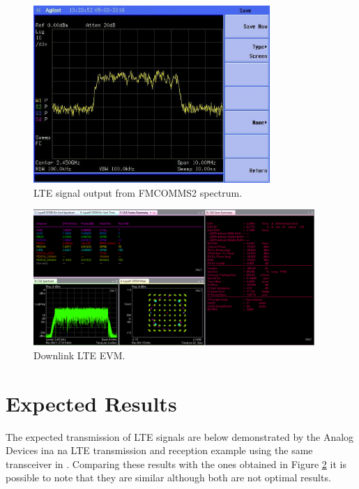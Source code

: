 \begin{figure}[htbp]
    \centering
    \includegraphics[width=0.8\textwidth,
    trim={0 0 {.27\textwidth} {.1\textwidth}},
    clip]{./figures/lte_5m}
    \caption{ LTE signal output from FMCOMMS2 spectrum.
    \label{fig:lte5m}}
\end{figure}

%
\begin{figure}[htbp]
    \centering
    \includegraphics[width=0.95\textwidth]{./figures/evm}
    \caption{ Downlink LTE EVM.
    \label{fig:evm}}
\end{figure}
%
\vfill
\clearpage

\section{Expected Results}
\label{result:optimum}

The expected transmission of LTE signals are below demonstrated by the Analog
Devices ina na LTE transmission and reception example using the same
transceiver in \cite{web:lteexamplewiki}. Comparing these results with the ones
obtained in Figure \ref{fig:evm} it is possible to note that they are similar
although both are not optimal results.

